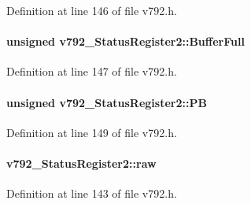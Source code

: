 Definition at line 146 of file v792.h.
\paragraph[{BufferFull}]{\setlength{\rightskip}{0pt plus 5cm}unsigned {\bf v792\_\-StatusRegister2::BufferFull}}\hfill\label{unionv792__StatusRegister2_a9524f84e8d5831fadae6931e3c4b05b2}


Definition at line 147 of file v792.h.
\paragraph[{PB}]{\setlength{\rightskip}{0pt plus 5cm}unsigned {\bf v792\_\-StatusRegister2::PB}}\hfill\label{unionv792__StatusRegister2_addcf9a752e13e79915bd707a9e8cd12a}


Definition at line 149 of file v792.h.
\paragraph[{raw}]{ {\bf v792\_\-StatusRegister2::raw}}\hfill\label{unionv792__StatusRegister2_a4d53b8ad7a43019b3a3ac01666c65baf}


Definition at line 143 of file v792.h.